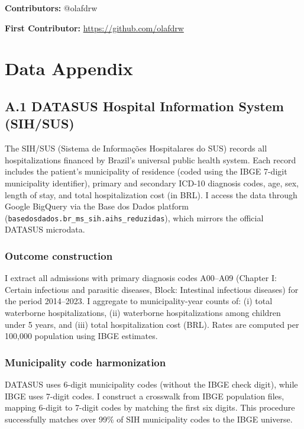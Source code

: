 \documentclass[12pt]{article}
\begin{document}
\noindent\textbf{Contributors:} @olafdrw

\noindent\textbf{First Contributor:} \url{https://github.com/olafdrw}

\label{apep_main_text_end}
\newpage


\newpage
\appendix

\section{Data Appendix}
\label{app:data}

\subsection*{A.1 DATASUS Hospital Information System (SIH/SUS)}

The SIH/SUS (Sistema de Informa\c{c}\~{o}es Hospitalares do SUS) records all hospitalizations financed by Brazil's universal public health system. Each record includes the patient's municipality of residence (coded using the IBGE 7-digit municipality identifier), primary and secondary ICD-10 diagnosis codes, age, sex, length of stay, and total hospitalization cost (in BRL). I access the data through Google BigQuery via the Base dos Dados platform (\texttt{basedosdados.br\_ms\_sih.aihs\_reduzidas}), which mirrors the official DATASUS microdata.

\subsubsection*{Outcome construction} I extract all admissions with primary diagnosis codes A00--A09 (Chapter I: Certain infectious and parasitic diseases, Block: Intestinal infectious diseases) for the period 2014--2023. I aggregate to municipality-year counts of: (i) total waterborne hospitalizations, (ii) waterborne hospitalizations among children under 5 years, and (iii) total hospitalization cost (BRL). Rates are computed per 100,000 population using IBGE estimates.

\subsubsection*{Municipality code harmonization} DATASUS uses 6-digit municipality codes (without the IBGE check digit), while IBGE uses 7-digit codes. I construct a crosswalk from IBGE population files, mapping 6-digit to 7-digit codes by matching the first six digits. This procedure successfully matches over 99\% of SIH municipality codes to the IBGE universe.
\end{document}
